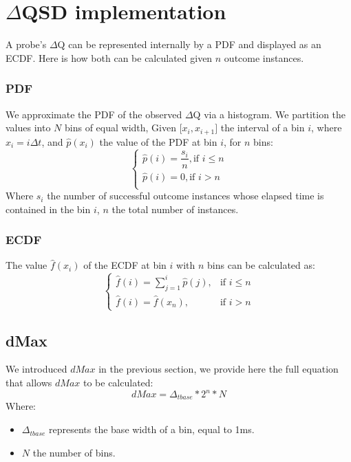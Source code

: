 \section{$\Delta$QSD implementation}
    A probe's $\Delta$Q can be represented internally by a PDF and displayed as an ECDF. Here is how both can be calculated given $n$ outcome instances.
    
    \subsubsection{PDF}
  We approximate the PDF of the observed $\Delta$Q via a histogram. We partition the values into $N$ bins of equal width, Given $\lbrack x_i, x_{i+1} \rbrack$ the interval of a bin $i$, where $x_i = i\Delta t$, and $\hat{p}(x_i)$ the value of the PDF at bin $i$, for $n$ bins:
        \begin{equation}
            \begin{cases}
                \hat{p}(i) = \dfrac{s_i}{n}, \text{if } i \le n \\
                \hat{p}(i) = 0, \text{if } i > n \\
            \end{cases}
            \label{eq:pdf}
        \end{equation}
    Where $s_i$ the number of successful outcome instances whose elapsed time is contained in the bin $i$, $n$ the total number of instances.

    \subsubsection{ECDF}
        The value $\hat{f}(x_i)$ of the ECDF at bin $i$ with $n$ bins can be calculated as:
        \begin{equation}
            \begin{cases}
                \hat{f}(i) = \sum_{j=1}^{i} \hat{p}(j), & \text{if } i \le n \\  
                \hat{f}(i) = \hat{f}(x_n), & \text{if } i > n 
            \end{cases}
            \label{eq:cdf}
        \end{equation}

    \subsection{dMax}
        We introduced $dMax$ in the previous section, we provide here the full equation that allows $dMax$ to be calculated:
        \begin{equation}
            dMax = \Delta_{t base} * 2^n * N  
            \label{eq:dMaxU}
        \end{equation}
        Where:
        \begin{itemize}
            \item $\Delta_{t base}$ represents the base width of a bin, equal to 1ms.
            \item $N$ the number of bins.
        \end{itemize}


